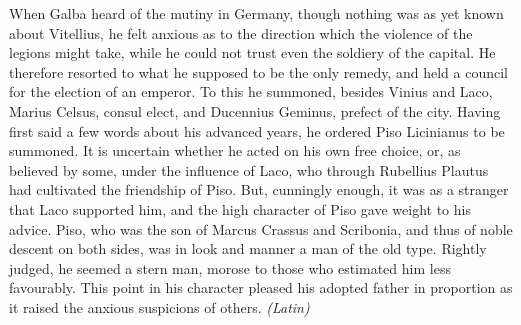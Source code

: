 
When Galba heard of the mutiny in Germany, though nothing was as yet known about Vitellius, he felt anxious as to the direction which the violence of the legions might take, while he could not trust even the soldiery of the capital. He therefore resorted to what he supposed to be the only remedy, and held a council for the election of an emperor. To this he summoned, besides Vinius and Laco, Marius Celsus, consul elect, and Ducennius Geminus, prefect of the city. Having first said a few words about his advanced years, he ordered Piso Licinianus to be summoned. It is uncertain whether he acted on his own free choice, or, as believed by some, under the influence of Laco, who through Rubellius Plautus had cultivated the friendship of Piso. But, cunningly enough, it was as a stranger that Laco supported him, and the high character of Piso gave weight to his advice. Piso, who was the son of Marcus Crassus and Scribonia, and thus of noble descent on both sides, was in look and manner a man of the old type. Rightly judged, he seemed a stern man, morose to those who estimated him less favourably. This point in his character pleased his adopted father in proportion as it raised the anxious suspicions of others. \emph{(Latin)}


